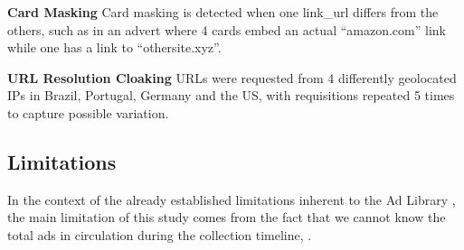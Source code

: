 \textbf{Card Masking} Card masking is detected when one link\_url differs from the others, such as in an advert where 4 cards embed an actual ``amazon.com'' link while one has a link to ``othersite.xyz''.


\textbf{URL Resolution Cloaking}
URLs were requested from 4 differently geolocated IPs in Brazil, Portugal, Germany and the US, with requisitions repeated 5 times to capture possible variation. 


\subsection{Limitations}
In the context of the already established limitations inherent to the Ad Library \cite{transparencyLimitationAdLib, metaAudit, adLibBet}, the main limitation of this study comes from the fact that we cannot know the total ads in circulation during the collection timeline, .
